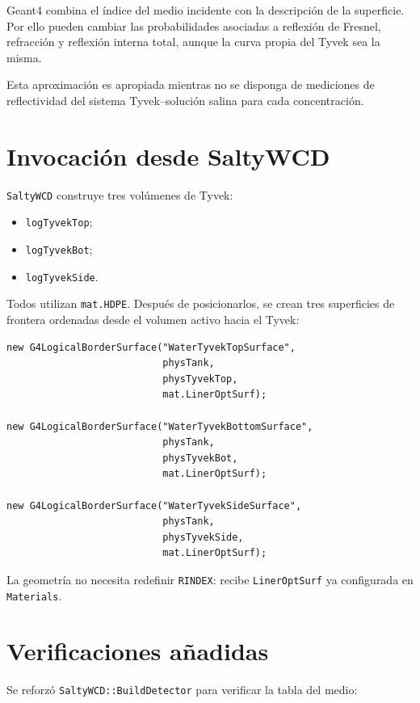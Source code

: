 \documentclass[11pt,a4paper]{article}
\newcommand{\codigo}[1]{\nolinkurl{#1}}
\begin{document}
Geant4 combina el índice del medio incidente con la descripción de la
superficie. Por ello pueden cambiar las probabilidades asociadas a reflexión de
Fresnel, refracción y reflexión interna total, aunque la curva propia del Tyvek
sea la misma.

Esta aproximación es apropiada mientras no se disponga de mediciones de
reflectividad del sistema Tyvek--solución salina para cada concentración.

\section{Invocación desde SaltyWCD}

\codigo{SaltyWCD} construye tres volúmenes de Tyvek:

\begin{itemize}
  \item \codigo{logTyvekTop};
  \item \codigo{logTyvekBot};
  \item \codigo{logTyvekSide}.
\end{itemize}

Todos utilizan \codigo{mat.HDPE}. Después de posicionarlos, se crean tres
superficies de frontera ordenadas desde el volumen activo hacia el Tyvek:

\begin{lstlisting}
new G4LogicalBorderSurface("WaterTyvekTopSurface",
                           physTank,
                           physTyvekTop,
                           mat.LinerOptSurf);

new G4LogicalBorderSurface("WaterTyvekBottomSurface",
                           physTank,
                           physTyvekBot,
                           mat.LinerOptSurf);

new G4LogicalBorderSurface("WaterTyvekSideSurface",
                           physTank,
                           physTyvekSide,
                           mat.LinerOptSurf);
\end{lstlisting}

La geometría no necesita redefinir \codigo{RINDEX}: recibe
\codigo{LinerOptSurf} ya configurada en \codigo{Materials}.

\section{Verificaciones añadidas}

Se reforzó \codigo{SaltyWCD::BuildDetector} para verificar la tabla del medio:
\end{document}

